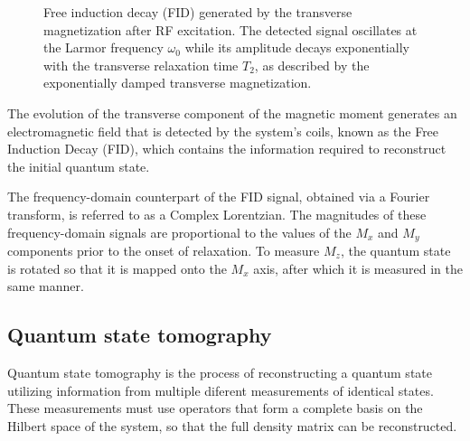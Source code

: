 \begin{figure}[ht]
    \centering
\caption{Free induction decay (FID) generated by the transverse magnetization after RF excitation. The detected signal oscillates at the Larmor frequency $\omega_0$ while its amplitude decays exponentially with the transverse relaxation time $T_2$, as described by the exponentially damped transverse magnetization.}
\label{fig:FID}
\end{figure}

The evolution of the transverse component of the magnetic moment generates an electromagnetic field that is detected by the system’s coils, known as the Free Induction Decay (FID), which contains the information required to reconstruct the initial quantum state.

The frequency-domain counterpart of the FID signal, obtained via a Fourier transform, is referred to as a Complex Lorentzian. The magnitudes of these frequency-domain signals are proportional to the values of the \(M_x\) and \(M_y\) components prior to the onset of relaxation. To measure \(M_z\), the quantum state is rotated so that it is mapped onto the \(M_x\) axis, after which it is measured in the same manner.

\subsection{Quantum state tomography}
\label{subsec:quantum_state_tomography}

Quantum state tomography is the process of reconstructing a quantum state utilizing information from multiple diferent measurements of identical states. These measurements must use operators that form a complete basis on the Hilbert space of the system, so that the full density matrix can be reconstructed. 

